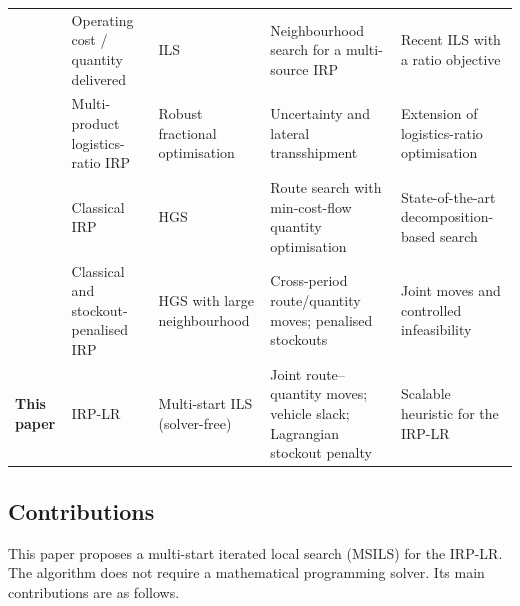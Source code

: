\begin{table}[!htbp]
\begin{tabularx}{\textwidth}{
>{\raggedright\arraybackslash}p{2.3cm}
>{\raggedright\arraybackslash}p{2.6cm}
>{\raggedright\arraybackslash}p{2.8cm}
>{\raggedright\arraybackslash}X
>{\raggedright\arraybackslash}X}
\citet{alonsopecina2024iterated} & Operating cost / quantity delivered
  & ILS & Neighbourhood search for a multi-source IRP
  & Recent ILS with a ratio objective \\
\citet{man2025logistics} & Multi-product logistics-ratio IRP
  & Robust fractional optimisation & Uncertainty and lateral transshipment
  & Extension of logistics-ratio optimisation \\
\citet{castro2026hybrid} & Classical IRP & HGS
  & Route search with min-cost-flow quantity optimisation
  & State-of-the-art decomposition-based search \\
\citet{zhao2025large} & Classical and stockout-penalised IRP
  & HGS with large neighbourhood
  & Cross-period route/quantity moves; penalised stockouts
  & Joint moves and controlled infeasibility \\
\midrule
\textbf{This paper} & IRP-LR & Multi-start ILS (solver-free)
  & Joint route--quantity moves; vehicle slack; Lagrangian stockout penalty
  & Scalable heuristic for the IRP-LR \\
\bottomrule
\end{tabularx}
\end{table}

\subsection{Contributions}
\label{sec:intro_contributions}

This paper proposes a multi-start iterated local search (MSILS) for the
IRP-LR. The algorithm does not require a mathematical programming solver.
Its main contributions are as follows.

